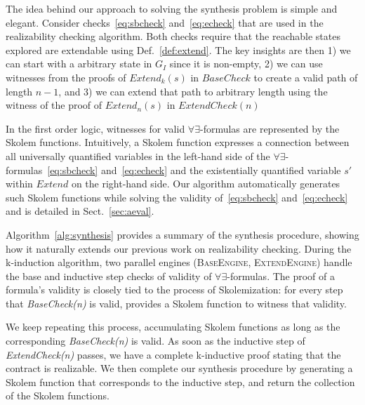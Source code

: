 The idea behind our approach to solving the synthesis problem is
simple and elegant. Consider checks~\eqref{eq:sbcheck}
and~\eqref{eq:echeck} that are used in the realizability checking
algorithm. Both checks require that the reachable states explored are
extendable using Def.~\ref{def:extend}. The key insights are then 1)
we can start with a arbitrary state in $G_I$ since it is non-empty, 2)
we can use witnesses from the proofs of $\mathit{Extend}_k(s)$ in
$\mathit{BaseCheck}$ to create a valid path of length $n-1$, and 3) we
can extend that path to arbitrary length using the witness of the
proof of $\mathit{Extend}_n(s)$ in $\mathit{ExtendCheck}(n)$

In the first order logic, witnesses for valid
$\forall\exists$-formulas are represented by the Skolem functions.
Intuitively, a Skolem function expresses a connection between all
universally quantified variables in the left-hand side of the
$\forall\exists$-formulas~\eqref{eq:sbcheck} and~\eqref{eq:echeck} and
the existentially quantified variable $s'$ within $\mathit{Extend}$ on
the right-hand side. Our algorithm automatically generates such Skolem
functions while solving the validity of~\eqref{eq:sbcheck}
and~\eqref{eq:echeck} and is detailed in Sect.~\ref{sec:aeval}.


Algorithm~\ref{alg:synthesis} provides a summary of the synthesis
procedure, showing how it naturally extends our previous work on
realizability checking. During the k-induction algorithm, two parallel
engines (\textsc{BaseEngine, ExtendEngine}) handle the base and
inductive step checks of validity of $\forall\exists$-formulas. The
proof of a formula's validity is closely tied to the process of
Skolemization: for every step that \textit{BaseCheck(n)} is valid, \aeval
provides a Skolem function to witness that validity.

We keep repeating this process, accumulating Skolem functions
as long as the corresponding \textit{BaseCheck(n)} is valid. As soon
as the inductive step of \textit{ExtendCheck(n)} passes, we have a
complete k-inductive proof stating that the contract is realizable. We
then complete our synthesis procedure by generating a Skolem function
that corresponds to the inductive step, and return the collection of
the Skolem functions.

